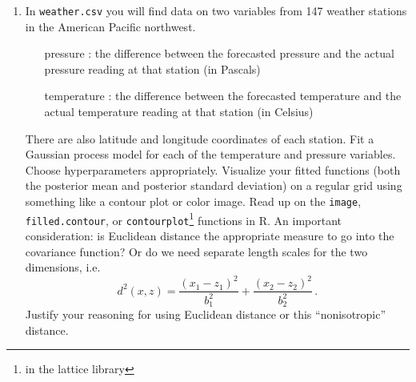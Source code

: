 \documentclass{homework}
\newcommand{\1}{\mathbf{1}}
\begin{document}
\begin{enumerate}[label=(\Alph*)]
\item In \verb|weather.csv| you will find data on two variables from 147 weather stations in the American Pacific northwest.
\begin{itemize}
\item[pressure]: the difference between the forecasted pressure and the actual pressure reading at that station (in Pascals)
\item[temperature]: the difference between the forecasted temperature and the actual temperature reading at that station (in Celsius)
\end{itemize}
There are also latitude and longitude coordinates of each  station.  Fit a Gaussian process model for each of the temperature and pressure variables.  Choose hyperparameters appropriately.  Visualize your fitted functions (both the posterior mean and posterior standard deviation) on a regular grid using something like a contour plot or color image.  Read up on the \verb|image|, \verb|filled.contour|, or \verb|contourplot|\footnote{in the lattice library} functions in R.  An important consideration: is Euclidean distance the appropriate measure to go into the covariance function?  Or do we need separate length scales for the two dimensions, i.e.
$$
d^2(x, z) = \frac{(x_1 - z_1)^2}{b_1^2} +  \frac{(x_2 - z_2)^2}{b_2^2} \, .
$$
Justify your reasoning for using Euclidean distance or this ``nonisotropic'' distance.


%
%

\end{enumerate}
\end{document}
